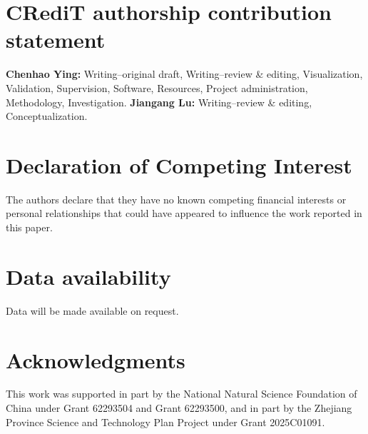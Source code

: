 \documentclass[final,3p,times]{elsarticle}
\begin{document}







\FloatBarrier



\section*{CRediT authorship contribution statement}
\textbf{Chenhao Ying:} Writing--original draft, Writing--review \& editing,
Visualization, Validation, Supervision, Software, Resources, Project
administration, Methodology, Investigation. \textbf{Jiangang Lu:}
Writing--review \& editing, Conceptualization.

\section*{Declaration of Competing Interest}
The authors declare that they have no known competing financial interests or
personal relationships that could have appeared to influence the work reported
in this paper.

\section*{Data availability}
Data will be made available on request.

\section*{Acknowledgments}
This work was supported in part by the National Natural Science Foundation of
China under Grant 62293504 and Grant 62293500, and in part by the Zhejiang
Province Science and Technology Plan Project under Grant 2025C01091.

\appendix
\renewcommand*{\theHtable}{appendix.\Alph{section}.\arabic{table}}
\renewcommand*{\theHfigure}{appendix.\Alph{section}.\arabic{figure}}




\end{document}
